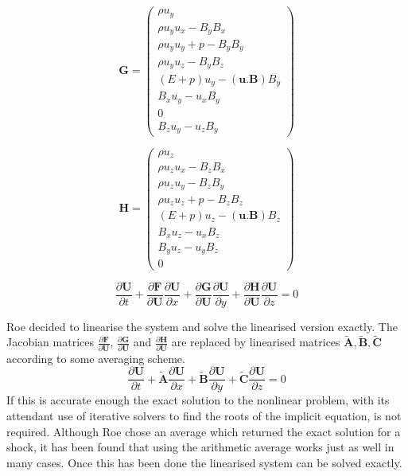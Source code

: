 \begin{equation}
\mathbf{G}=\left(
\begin{array}{c}
\rho u_y \\
\rho u_y u_x  - B_y B_x  \\
\rho u_y u_y +p - B_y B_y \\
\rho u_y u_z  - B_y B_z\\
(E+p)u_y - (\mathbf{u.B})B_y \\
B_x u_y -u_x B_y \\
0\\
B_z u_y -u_z B_y 
\end{array}
\right)
\end{equation}

\begin{equation}
\mathbf{H}=\left(
\begin{array}{c}
\rho u_z \\
\rho u_z u_x  - B_z B_x  \\
\rho u_z u_y  - B_z B_y \\
\rho u_z u_z +p - B_z B_z\\
(E+p)u_z - (\mathbf{u.B})B_z \\
 B_x u_z - u_x B_z \\
 B_y u_z - u_y B_z \\
0
\end{array}
\right)
\end{equation}

\begin{equation}
\frac{\partial \mathbf{U} }{\partial t}+
\frac{\partial \mathbf{F} }{\partial \mathbf{U}}
\frac{\partial \mathbf{U} }{\partial x}
+
\frac{\partial \mathbf{G} }{\partial \mathbf{U}}
\frac{\partial \mathbf{U} }{\partial y}
+
\frac{\partial \mathbf{H} }{\partial \mathbf{U}}
\frac{\partial \mathbf{U} }{\partial z}
=0
\end{equation}

Roe decided to linearise the system and solve the linearised version exactly.
The Jacobian matrices 
$\frac{\partial \mathbf{F} }{\partial \mathbf{U}}$,
$\frac{\partial \mathbf{G} }{\partial \mathbf{U}}$ and
$\frac{\partial \mathbf{H} }{\partial \mathbf{U}}$ 
are replaced by linearised matrices $ \mathbf{\tilde{A}}, \mathbf{\tilde{B}} , \mathbf{\tilde{C}}$ according to some averaging scheme.
\begin{equation}
\frac{\partial \mathbf{U} }{\partial t}+
\mathbf{\tilde{A}} \frac{\partial \mathbf{U} }{\partial x}
+\mathbf{\tilde{B}} \frac{\partial \mathbf{U} }{\partial y}
+\mathbf{\tilde{C}} \frac{\partial \mathbf{U} }{\partial z}
=0
\end{equation}
If this is accurate enough the exact solution to the nonlinear problem, with its attendant use of iterative solvers to find the roots of the implicit equation, is not required.
Although Roe chose an average which returned the exact solution for a shock, it
has been found that using the arithmetic average works just as well in many
cases.
Once this has been done the linearised system can be solved exactly.

